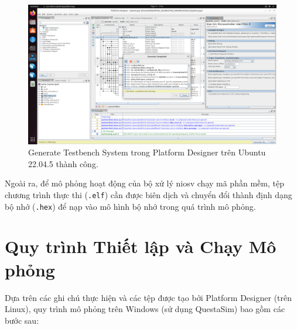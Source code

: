 \begin{figure}[htbp]
    \centering
    \includegraphics[width=\linewidth]{Images/04_01_UbuntuGenerateTestbenchSystem.png}
    \caption{Generate Testbench System trong Platform Designer trên Ubuntu 22.04.5 thành công.}
    \label{fig:04_01_UbuntuGenerateTestbenchSystem}
\end{figure}

Ngoài ra, để mô phỏng hoạt động của bộ xử lý \acrshort{niosv} chạy mã phần mềm, tệp chương trình thực thi (\texttt{.elf}) cần được biên dịch và chuyển đổi thành định dạng bộ nhớ (\texttt{.hex}) để nạp vào mô hình bộ nhớ trong quá trình mô phỏng.

\section{Quy trình Thiết lập và Chạy Mô phỏng}

Dựa trên các ghi chú thực hiện và các tệp được tạo bởi Platform Designer (trên Linux), quy trình mô phỏng trên Windows (sử dụng QuestaSim) bao gồm các bước sau:

